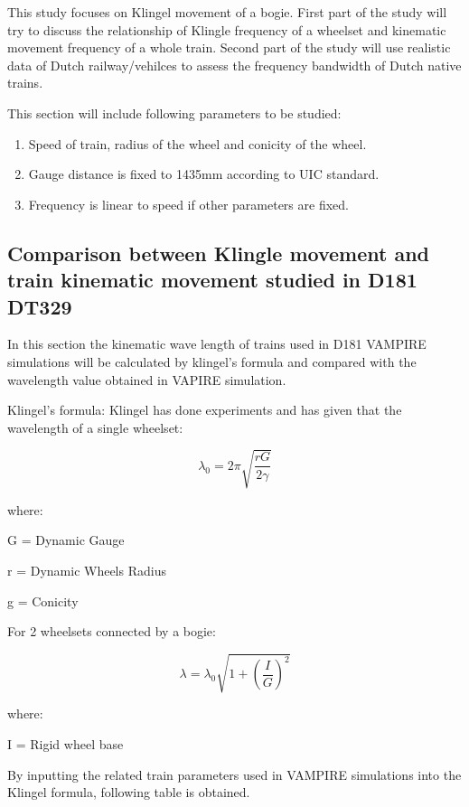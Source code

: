 This  study focuses on Klingel movement of a bogie. First part of the  study will try to discuss the relationship of Klingle frequency of a wheelset and kinematic movement frequency of a whole train. Second part of the study will use realistic data of Dutch railway/vehilces to assess the frequency bandwidth of Dutch native trains.

This section will include following parameters to be studied:

\begin{enumerate}[-]
	\item Speed of train, radius of the wheel and conicity of the wheel. 
	\item Gauge distance is fixed to 1435mm according to UIC standard. 
	\item Frequency is linear to speed if other parameters are fixed.
\end{enumerate}


\subsection{Comparison between Klingle movement and train kinematic movement studied in D181 DT329}

In this section the kinematic wave length of trains used in D181 VAMPIRE simulations will be calculated by klingel's formula and compared with the wavelength value obtained in VAPIRE simulation.

Klingel's formula:
Klingel has done experiments and has given that the wavelength of a single wheelset:

$$ \lambda_0 = 2 \pi \sqrt{\frac{rG}{2\gamma} }$$

where:

G = Dynamic Gauge

r = Dynamic Wheels Radius

g = Conicity

For 2 wheelsets connected by a bogie:

$$ \lambda = \lambda_0 \sqrt{1+(\frac{I}{G})^2}  $$

where:

I = Rigid wheel base

By inputting the related train parameters used in VAMPIRE simulations into the Klingel formula, following table is obtained.

